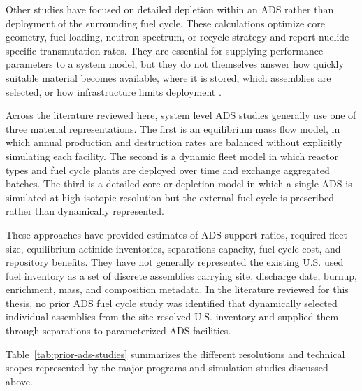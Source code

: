 Other studies have focused on detailed depletion within an \gls{ADS} rather than
deployment of the surrounding fuel cycle. These calculations optimize core
geometry, fuel loading, neutron spectrum, or recycle strategy and report
nuclide-specific transmutation rates. They are essential for supplying
performance parameters to a system model, but they do not themselves answer
how quickly suitable material becomes available, where it is stored, which
assemblies are selected, or how infrastructure limits deployment
\cite{gohar_ads_2021}.

Across the literature reviewed here, system level \gls{ADS} studies generally use
one of three material representations. The first is an equilibrium mass flow
model, in which annual production and destruction rates are balanced without
explicitly simulating each facility. The second is a dynamic fleet model in
which reactor types and fuel cycle plants are deployed over time and exchange
aggregated batches. The third is a detailed core or depletion model in which
a single \gls{ADS} is simulated at high isotopic resolution but the external fuel
cycle is prescribed rather than dynamically represented.

These approaches have provided estimates of \gls{ADS} support ratios, required
fleet size, equilibrium actinide inventories, separations capacity, fuel cycle
cost, and repository benefits. They have not generally represented the
existing U.S. used fuel inventory as a set of discrete assemblies carrying
site, discharge date, burnup, enrichment, mass, and composition metadata. In
the literature reviewed for this thesis, no prior \gls{ADS} fuel cycle study was
identified that dynamically selected individual assemblies from the
site-resolved U.S. inventory and supplied them through separations to
parameterized \gls{ADS} facilities.

Table~\ref{tab:prior-ads-studies} summarizes the different resolutions and
technical scopes represented by the major programs and simulation studies
discussed above.

